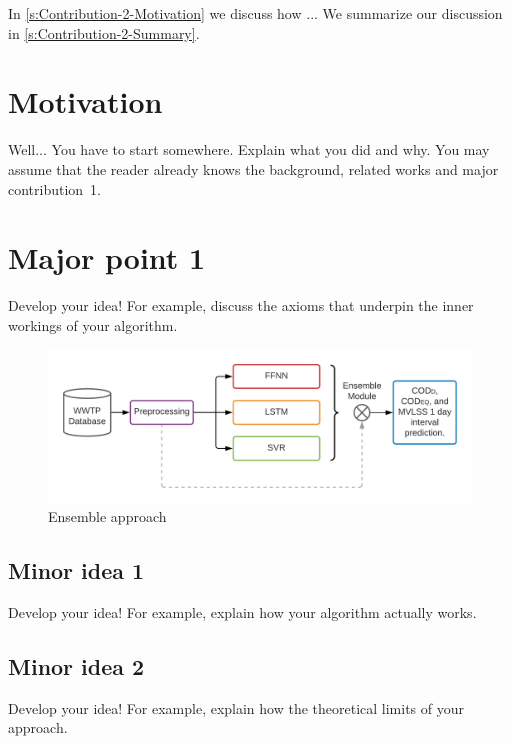 In \autoref{s:Contribution-2-Motivation} we discuss how ...  We summarize our discussion in \autoref{s:Contribution-2-Summary}.

\section{Motivation}
\label{s:Contribution-2-Motivation}

Well... You have to start somewhere. Explain what you did and why. You may assume that the reader already knows the background, related works and major contribution~1.

\section{Major point 1}
\label{s:Contribution-2-Major-1}
Develop your idea! For example, discuss the axioms that underpin the inner workings of your algorithm.

\begin{figure}[h]
\centering
\includegraphics[width=\linewidth]{figures/Ch5/Thesis-Approaches-Ensemble.png}
\caption{Ensemble approach}
\label{f:Ensemble-approach}
\end{figure}


\subsection{Minor idea 1}
\label{s:Contribution-2-Major-1-Minor-1}
Develop your idea! For example, explain how your algorithm actually works.



\subsection{Minor idea 2}
\label{s:Contribution-2-Major-1-Minor-2}
Develop your idea! For example, explain how the theoretical limits of your approach.


